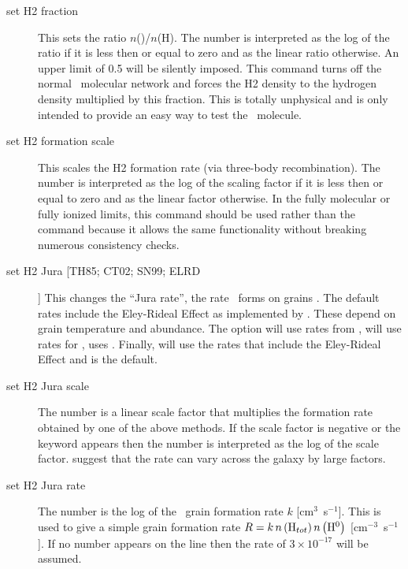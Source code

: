 \begin{description}
\item[set H2 fraction]  This sets the ratio $n$(\htwo)/$n$(H).
The number is
interpreted as the log of the ratio if it is less then or equal to zero
and as the linear ratio otherwise.
An upper limit of 0.5 will be silently
imposed.
This command turns off the normal \htwo\ molecular network and forces
the H2 density to the hydrogen density multiplied by this fraction.
This
is totally unphysical and is only intended to provide an easy way to test
the \htwo\ molecule.

\item[set H2 formation scale]  This scales the H2 formation rate
(via three-body recombination). The number is
interpreted as the log of the scaling factor if it is less then or equal to zero
and as the linear factor otherwise.  In the fully molecular or fully
ionized limits, this command should be used rather than the
 command because it allows the same functionality without
breaking numerous consistency checks.

\item[set H2 Jura [TH85; CT02; SN99; ELRD]]  This changes the ``Jura rate'', the rate
\htwo\ forms on grains \citep{Jura1975}.
The default  rates  include the
Eley-Rideal Effect \citep{LeBourlot12, Rollig13} as implemented by
\citet{Rollig13}.
These depend on grain temperature and abundance.
The option  will use rates from \citet{Tielens1985a},   
will use rates for \citet{Sternberg1999},   uses \citet{Cazaux2002}.
Finally,  will use the rates that include the
Eley-Rideal Effect \citep{LeBourlot12, Rollig13} and is the default.

\item[set H2 Jura scale]   The number is a linear scale factor that
multiplies the formation rate obtained by one of the above methods.  If
the scale factor is negative or the keyword  appears then the number
is interpreted as the log of the scale factor.
\citet{Habart2004} suggest
that the rate can vary across the galaxy by large factors.

\item[set H2 Jura rate]  The number is the log of the \htwo\ grain
formation rate $k$ [cm$^3$~s$^{-1}$].  This is used to give a simple grain formation
rate $R = k\,n\left( {{\mathrm{H}}_{tot} } \right)n\left( {\mbox{{\rm H}$^0$} } \right)$
 [cm$^{-3}$~s$^{-1}$].  If no number appears on the line then the \citet{Jura1975} rate
of $3 \times 10^{-17}$ will be assumed.


\end{description}
